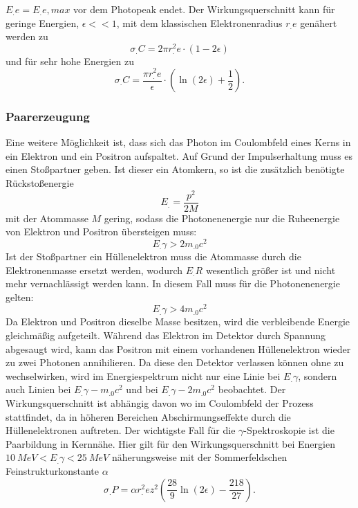 $E_.e=E_.{e,max}$ vor dem Photopeak endet.
Der Wirkungsquerschnitt kann für geringe Energien, $\epsilon << 1$, mit dem klassischen Elektronenradius $r_.e$ genähert werden zu 
\begin{equation}
\sigma_.C=2\pi r^2_.e\cdot\left(1-2\epsilon\right)\label{eq:s_C_klein}
\end{equation}
und für sehr hohe Energien zu
\begin{equation}
\sigma_.C=\frac{\pi r^2_.e}{\epsilon}\cdot\left(\ln(2\epsilon)+\frac{1}{2}\right)\text{.}\label{eq:s_C_gross}
\end{equation}

\subsubsection{Paarerzeugung}

Eine weitere Möglichkeit ist, dass sich das Photon im Coulombfeld eines Kerns in ein Elektron und ein Positron aufspaltet. Auf Grund der Impulserhaltung muss es einen Stoßpartner geben. Ist dieser ein Atomkern, so ist die zusätzlich benötigte Rückstoßenergie 
\[
E_.=\frac{p^2}{2M}
\]
mit der Atommasse $M$ gering, sodass die Photonenenergie nur die Ruheenergie von Elektron und Positron übersteigen muss:
\[
E_.{\gamma}>2m_.0c^2
\]
Ist der Stoßpartner ein Hüllenelektron muss die Atommasse durch die Elektronenmasse ersetzt werden, wodurch $E_.R$ wesentlich größer ist und nicht mehr vernachlässigt werden kann.
In diesem Fall muss für die Photonenenergie gelten:
\[
E_.{\gamma}>4m_.0c^2
\]
Da Elektron und Positron dieselbe Masse besitzen, wird die verbleibende Energie gleichmäßig aufgeteilt.
Während das Elektron im Detektor durch Spannung abgesaugt wird, kann das Positron mit einem vorhandenen Hüllenelektron wieder zu zwei Photonen annihilieren.
Da diese den Detektor verlassen können ohne zu wechselwirken, wird im Energiespektrum nicht nur eine Linie bei $E_.{\gamma}$, sondern auch Linien bei $E_.{\gamma}-m_.0c^2$ und bei $E_.{\gamma}-2m_.0c^2$ beobachtet.
Der Wirkungsquerschnitt ist abhängig davon wo im Coulombfeld der Prozess stattfindet, da in höheren Bereichen Abschirmungseffekte durch die Hüllenelektronen auftreten.
Der wichtigste Fall für die $\gamma$-Spektroskopie ist die Paarbildung in Kernnähe.
Hier gilt für den Wirkungsquerschnitt bei Energien $\SI{10}{MeV}<E_.{\gamma}<\SI{25}{MeV}$ näherungsweise mit der Sommerfeldschen Feinstrukturkonstante $\alpha$
\begin{equation}
\sigma_.P=\alpha r^2_.ez^2\left(\frac{28}{9}\ln(2\epsilon)-\frac{218}{27}\right)\text{.}\label{eq:s_P}
\end{equation}

